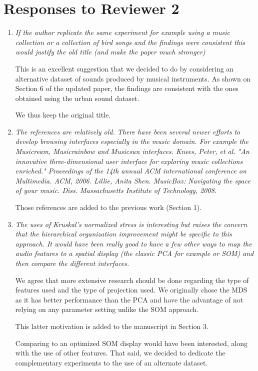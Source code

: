 \documentclass[10pt]{article}
\begin{document}
\section{Responses to Reviewer 2}


\begin{enumerate}

\item \emph{If the author replicate the same experiment for example using a music collection or a collection of bird songs and the findings were consistent 
this would justify the old title (and make the paper much stronger)}

This is an excellent suggestion that we decided to do by considering an alternative dataset of sounds produced by musical instruments. As shown on Section 6 of the updated paper, the findings are consistent with the ones obtained using the urban sound dataset.

We thus keep the original title.

\item \emph{The references are relatively old. There have been several newer efforts to develop browsing interfaces especially in the music domain. 
For example the Musicream, Musicrainbow and Musicsun interfaces. 
Knees, Peter, et al. "An innovative three-dimensional user interface for exploring music collections enriched." Proceedings of the 14th annual ACM international conference on Multimedia. ACM, 2006.
Lillie, Anita Shen. MusicBox: Navigating the space of your music. Diss. Massachusetts Institute of Technology, 2008.}

Those references are added to the previous work (Section 1).

\item \emph{The uses of Kruskal's normalized stress is interesting but raises the concern that the hierarchical organization improvement might be specific to this approach. It would have been 
really good to have a few other ways to map the audio features to a spatial display (the classic PCA for example or SOM) and then compare the different interfaces.}

We agree that more extensive research should be done regarding the type of features used and the type of projection used. We originally chose the MDS as it has better performance than the PCA and have the advantage of not relying on any parameter setting unlike the SOM approach. 

This latter motivation is added to the manuscript in Section 3. 

Comparing to an optimized SOM display would have been interested, along with the use of other features. That said, we decided to dedicate the complementary experiments to the use of an alternate dataset.


\end{enumerate}
\end{document}
